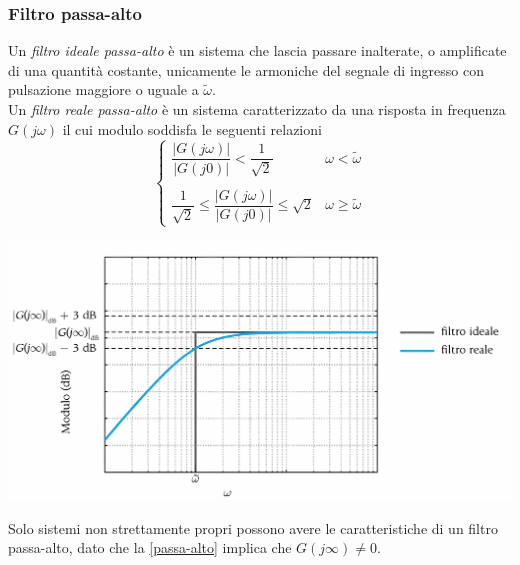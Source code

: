 \documentclass{article}
\numberwithin{equation}{subsection}
\begin{document}
\subsubsection{Filtro passa-alto}
Un \textit{filtro ideale passa-alto} è un sistema che lascia passare inalterate, o amplificate di una quantità costante, unicamente le armoniche del segnale di ingresso con pulsazione maggiore o uguale a $\tilde{\omega}$.\\
Un \textit{filtro reale passa-alto} è un sistema caratterizzato da una risposta in frequenza $G(j\omega)$ il cui modulo soddisfa le seguenti relazioni
\begin{equation}\label{passa-alto}
    \begin{cases}
        \dfrac{|G(j\omega)|}{|G(j 0)|} < \dfrac{1}{\sqrt{2}} & \omega< \tilde{\omega}\\
        \\
        \dfrac{1}{\sqrt{2}} \leq \dfrac{|G(j\omega)|}{|G(j 0)|} \leq \sqrt{2} &\omega \geq \tilde{\omega}
    \end{cases}
\end{equation}
\begin{center}
    \includegraphics[scale=0.125]{Images/Passa_alto.png}
\end{center}
Solo sistemi non strettamente propri possono avere le caratteristiche di un filtro passa-alto, dato che la \ref{passa-alto} implica che $G(j\infty) \neq 0$.
\end{document}
